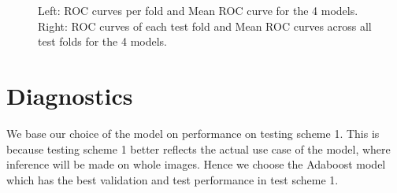 \documentclass[11pt, letterpaper, journal]{IEEEtran}
\begin{document}
\begin{figure}%
    \centering
    \qquad
    \caption{Left: ROC curves per fold and Mean ROC curve for the 4 models. Right: ROC curves of each test fold and Mean ROC curves across all test folds for the 4 models. }%
    \label{fig:ROC_curves scheme2}%
\end{figure}


\section{Diagnostics}
We base our choice of the model on performance on testing scheme 1. This is because testing scheme 1 better reflects the actual use case of the model, where inference will be made on whole images. Hence we choose the Adaboost model which has the best validation and test performance in test scheme 1.
\end{document}
